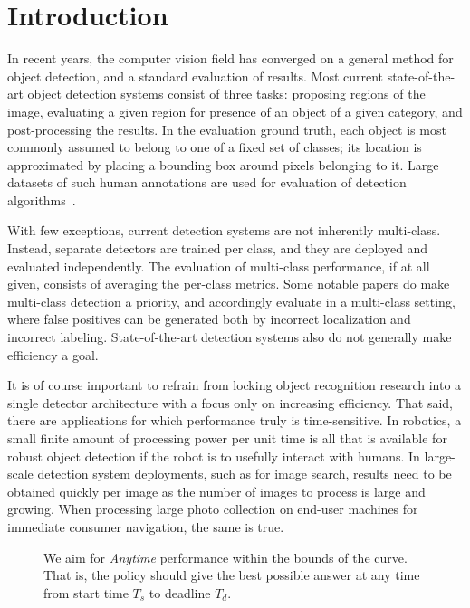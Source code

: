 \section{Introduction}

In recent years, the computer vision field has converged on a general method for object detection, and a standard evaluation of results.
Most current state-of-the-art object detection systems consist of three tasks: proposing regions of the image, evaluating a given region for presence of an object of a given category, and post-processing the results.
In the evaluation ground truth, each object is most commonly assumed to belong to one of a fixed set of classes; its location is approximated by placing a bounding box around pixels belonging to it.
Large datasets of such human annotations are used for evaluation of detection algorithms~\cite{pascal-voc-2010}.

With few exceptions, current detection systems are not inherently multi-class.
Instead, separate detectors are trained per class, and they are deployed and evaluated independently.
The evaluation of multi-class performance, if at all given, consists of averaging the per-class metrics.
Some notable papers do make multi-class detection a priority, and accordingly evaluate in a multi-class setting, where false positives can be generated both by incorrect localization and incorrect labeling.
State-of-the-art detection systems also do not generally make efficiency a goal.

It is of course important to refrain from locking object recognition research into a single detector architecture with a focus only on increasing efficiency.
That said, there are applications for which performance truly is time-sensitive.
In robotics, a small finite amount of processing power per unit time is all that is available for robust object detection if the robot is to usefully interact with humans.
In large-scale detection system deployments, such as for image search, results need to be obtained quickly per image as the number of images to process is large and growing.
When processing large photo collection on end-user machines for immediate consumer navigation, the same is true.

\begin{figure}[ht!]
  \caption{We aim for \emph{Anytime} performance within the bounds of the curve. That is, the policy should give the best possible answer at any time from start time $T_s$ to deadline $T_d$.}
  \label{fig:evaluation}
\end{figure}

